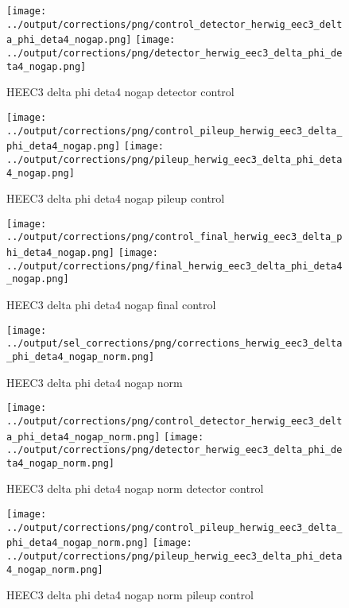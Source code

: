 \documentclass[11pt]{book}
\begin{document}
\begin{figure}[ht]
\centering
\texttt{[image: ../output/corrections/png/control\_detector\_herwig\_eec3\_delta\_phi\_deta4\_nogap.png]}
\texttt{[image: ../output/corrections/png/detector\_herwig\_eec3\_delta\_phi\_deta4\_nogap.png]}
\caption{HEEC3 delta phi deta4 nogap detector control}
\label{fig:HEEC3_delta_phi_deta4_nogap_detector_control}
\end{figure}

\begin{figure}[ht]
\centering
\texttt{[image: ../output/corrections/png/control\_pileup\_herwig\_eec3\_delta\_phi\_deta4\_nogap.png]}
\texttt{[image: ../output/corrections/png/pileup\_herwig\_eec3\_delta\_phi\_deta4\_nogap.png]}
\caption{HEEC3 delta phi deta4 nogap pileup control}
\label{fig:HEEC3_delta_phi_deta4_nogap_pileup_control}
\end{figure}


\begin{figure}[ht]
\centering
\texttt{[image: ../output/corrections/png/control\_final\_herwig\_eec3\_delta\_phi\_deta4\_nogap.png]}
\texttt{[image: ../output/corrections/png/final\_herwig\_eec3\_delta\_phi\_deta4\_nogap.png]}
\caption{HEEC3 delta phi deta4 nogap final control}
\label{fig:HEEC3_delta_phi_deta4_nogap_final_control}
\end{figure}


\begin{figure}[ht]
\centering
\texttt{[image: ../output/sel\_corrections/png/corrections\_herwig\_eec3\_delta\_phi\_deta4\_nogap\_norm.png]}
\caption{HEEC3 delta phi deta4 nogap norm}
\label{fig:HEEC3_delta_phi_deta4_nogap_norm}
\end{figure}

\begin{figure}[ht]
\centering
\texttt{[image: ../output/corrections/png/control\_detector\_herwig\_eec3\_delta\_phi\_deta4\_nogap\_norm.png]}
\texttt{[image: ../output/corrections/png/detector\_herwig\_eec3\_delta\_phi\_deta4\_nogap\_norm.png]}
\caption{HEEC3 delta phi deta4 nogap norm detector control}
\label{fig:HEEC3_delta_phi_deta4_nogap_norm_detector_control}
\end{figure}

\begin{figure}[ht]
\centering
\texttt{[image: ../output/corrections/png/control\_pileup\_herwig\_eec3\_delta\_phi\_deta4\_nogap\_norm.png]}
\texttt{[image: ../output/corrections/png/pileup\_herwig\_eec3\_delta\_phi\_deta4\_nogap\_norm.png]}
\caption{HEEC3 delta phi deta4 nogap norm pileup control}
\label{fig:HEEC3_delta_phi_deta4_nogap_norm_pileup_control}
\end{figure}
\end{document}
